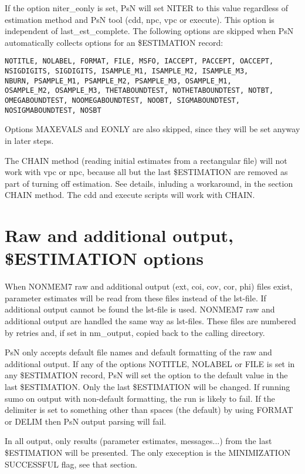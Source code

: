 \documentclass[a4paper,12pt]{article}
\begin{document}
If the option niter\_eonly is set, PsN will set NITER to this value regardless of estimation method and PsN tool (cdd, npc, vpc or execute). This option is independent of last\_est\_complete.
The following options are skipped when PsN automatically collects options for an \$ESTIMATION record:
\begin{verbatim}
NOTITLE, NOLABEL, FORMAT, FILE, MSFO, IACCEPT, PACCEPT, OACCEPT,
NSIGDIGITS, SIGDIGITS, ISAMPLE_M1, ISAMPLE_M2, ISAMPLE_M3,
NBURN, PSAMPLE_M1, PSAMPLE_M2, PSAMPLE_M3, OSAMPLE_M1,
OSAMPLE_M2, OSAMPLE_M3, THETABOUNDTEST, NOTHETABOUNDTEST, NOTBT,
OMEGABOUNDTEST, NOOMEGABOUNDTEST, NOOBT, SIGMABOUNDTEST,
NOSIGMABOUNDTEST, NOSBT
\end{verbatim}
Options MAXEVALS and EONLY are also skipped, since they will be set anyway in later steps.

The CHAIN method (reading initial estimates from a rectangular file) will not work with vpc or npc, because all but the last \$ESTIMATION are removed as part of turning off estimation. See details, inluding a workaround, in the section CHAIN method. The cdd and execute scripts will work with CHAIN.


\section{Raw and additional output, \$ESTIMATION options}

When NONMEM7 raw and additional output (ext, coi, cov, cor, phi) files exist, parameter estimates will be read from these files instead of the lst-file. If additional output cannot be found the lst-file is used. NONMEM7 raw and additional output are handled the same way as lst-files. These files are numbered by retries and, if set in nm\_output, copied back to the calling directory.

PsN only accepts default file names and default formatting of the raw and additional output. If any of the options NOTITLE, NOLABEL or FILE is set in any \$ESTIMATION record, PsN will set the option to the default value in the last \$ESTIMATION. Only the last \$ESTIMATION will be changed. If running sumo on output with non-default formatting, the run is likely to fail. If the delimiter is set to something other than spaces (the default) by using FORMAT or DELIM then PsN output parsing will fail.

In all output, only results (parameter estimates, messages...) from the last \$ESTIMATION will be presented. The only exeception is the MINIMIZATION SUCCESSFUL flag, see that section.
\end{document}

